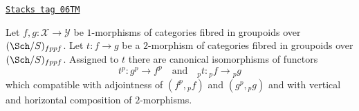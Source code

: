 \begin{lemma}
\label{stacks-sheaves-lemma-2-morphisms-presheaves}
\href{https://stacks.math.columbia.edu/tag/06TM}{\texttt{Stacks tag 06TM}}

Let $f, g : \mathcal{X} \to \mathcal{Y}$ be $1$-morphisms of categories
fibred in groupoids over $(\Sch/S)_{fppf}$. Let $t : f \to g$
be a $2$-morphism of categories fibred in groupoids over
$(\Sch/S)_{fppf}$. Assigned to $t$ there are canonical
isomorphisms of functors
$$
t^p : g^p \longrightarrow f^p
\quad\text{and}\quad
{}_pt : {}_pf \longrightarrow {}_pg
$$
which compatible with adjointness of $(f^p, {}_pf)$ and
$(g^p, {}_pg)$ and with
vertical and horizontal composition of $2$-morphisms.
\end{lemma}

